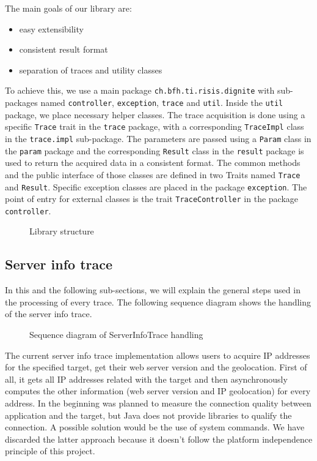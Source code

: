 \documentclass[
	a4paper,					10pt,							twoside,					openright,				notitlepage,			parskip=half,			]{scrreprt}
\begin{document}
The main goals of our library are:
\begin{itemize}
\item{easy extensibility}
\item{consistent result format}
\item{separation of traces and utility classes}
\end{itemize}

To achieve this, we use a main package \verb|ch.bfh.ti.risis.dignite| with 
sub-packages named \verb|controller|, \verb|exception|, \verb|trace| and \verb|util|. 
Inside the \verb|util| package, we place necessary helper classes. The trace acquisition is done using a specific
\verb|Trace| trait in the \verb|trace| package, with a corresponding \verb|TraceImpl| class in
the \verb|trace.impl| sub-package. The parameters are passed using a \verb|Param| class in the \verb|param| package
and the corresponding \verb|Result| class in the \verb|result| package is used to return 
the acquired data in a consistent format. The common methods and the public interface of those classes are defined in
two Traits named \verb|Trace| and \verb|Result|. Specific exception classes are placed in the package \verb|exception|. 
The point of entry for external classes is the trait \verb|TraceController| in the package \verb|controller|. 
\newpage
\begin{figure}[H] 
\caption{Library structure}
\label{fig:libstructure}
\end{figure}
\newpage
\subsection{Server info trace}
\label{subsec:api_libstruct_serverinfo}
In this and the following sub-sections, we will explain the general steps used in the processing of every trace. 
The following sequence diagram shows the handling of the server info trace. \\
\begin{figure}[H] 
\caption{Sequence diagram of ServerInfoTrace handling}
\label{fig:seq-serverinfotrace}
\end{figure}

The current server info trace implementation allows users to acquire \gls{IP} addresses for the specified target, 
get their web server version and the geolocation. First of all, it gets all \gls{IP} addresses related with the target 
and then asynchronously computes the other information (web server version and \gls{IP} geolocation) for every address.
In the beginning was planned to measure the connection quality between application and the target, 
but Java does not provide libraries to qualify the connection. A possible solution would be the use of system commands. 
We have discarded the latter approach because it doesn't follow the platform independence principle of this project.
\end{document}

